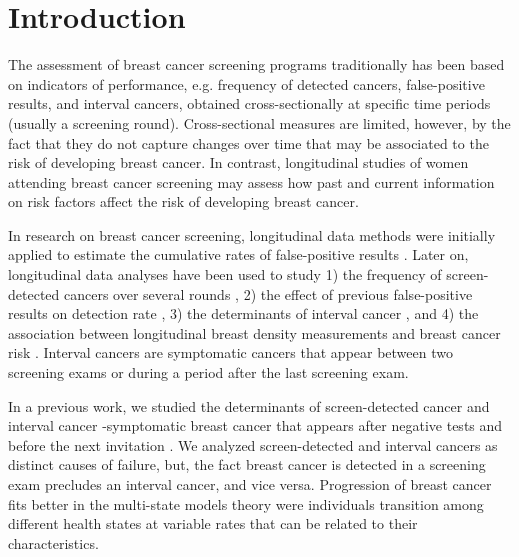\documentclass{bmcart}
\begin{document}
\section*{Introduction}
The assessment of breast cancer screening programs traditionally has been based on indicators of
performance, e.g. frequency of detected cancers, false-positive results, and interval cancers,
obtained cross-sectionally at specific time periods (usually a screening round). Cross-sectional
measures are limited, however, by the fact that they do not capture changes over time that may be
associated to the risk of developing breast cancer. In contrast, longitudinal studies of women
attending breast cancer screening may assess how past and current information on risk factors
affect the risk of developing breast cancer.

In research on breast cancer screening, longitudinal data methods were initially applied to
estimate the cumulative rates of false-positive results \cite{Elmore1998, Castells2006,
Hubbard2011, Roman2011b, Hofvind2012d}. Later on, longitudinal data analyses have been used to
study 1) the frequency of screen-detected cancers over several rounds \cite{Hofvind2006,
Blanch2013, Ripping2016}, 2) the effect of previous false-positive results on detection rate
\cite{VonEuler-Chelpin2012, Castells2013b}, 3) the determinants of interval cancer
\cite{Hofvind2006, Blanch2014}, and 4) the association between longitudinal breast density
measurements and breast cancer risk \cite{Armero2016}. Interval cancers are symptomatic cancers
that appear between two screening exams or during a period after the last screening exam.

In a previous work, we studied the determinants of screen-detected cancer and interval cancer
-symptomatic breast cancer that appears after negative tests and before the next invitation
\cite{Blanch2014}. We analyzed screen-detected and interval cancers as distinct causes of failure,
but, the fact breast cancer is detected in a screening exam precludes an interval cancer, and vice
versa. Progression of breast cancer fits better in the multi-state models theory were individuals
transition among different health states at variable rates that can be related to their
characteristics. 
\end{document}
